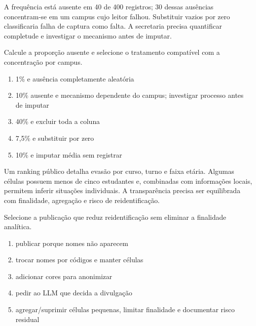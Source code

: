 
\TextoBase

A frequência está ausente em 40 de 400 registros; 30 dessas ausências concentram-se em um campus cujo leitor falhou. Substituir vazios por zero classificaria falha de captura como falta. A secretaria precisa quantificar completude e investigar o mecanismo antes de imputar.

\FonteDidatica

\Comando Calcule a proporção ausente e selecione o tratamento compatível com a concentração por campus.

\begin{enumerate}[label=\Alph*)]

\item 1\% e ausência completamente aleatória

\item 10\% ausente e mecanismo dependente do campus; investigar processo antes de imputar

\item 40\% e excluir toda a coluna

\item 7,5\% e substituir por zero

\item 10\% e imputar média sem registrar

\end{enumerate}


\TextoBase

Um ranking público detalha evasão por curso, turno e faixa etária. Algumas células possuem menos de cinco estudantes e, combinadas com informações locais, permitem inferir situações individuais. A transparência precisa ser equilibrada com finalidade, agregação e risco de reidentificação.

\FonteDidatica

\Comando Selecione a publicação que reduz reidentificação sem eliminar a finalidade analítica.

\begin{enumerate}[label=\Alph*)]

\item publicar porque nomes não aparecem

\item trocar nomes por códigos e manter células

\item adicionar cores para anonimizar

\item pedir ao LLM que decida a divulgação

\item agregar/suprimir células pequenas, limitar finalidade e documentar risco residual

\end{enumerate}

